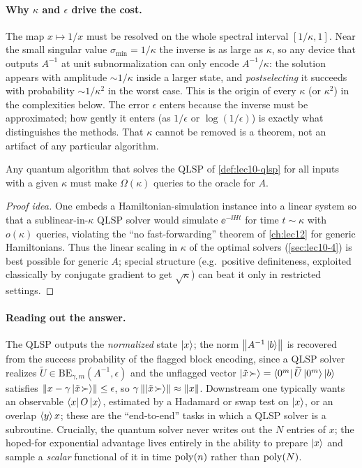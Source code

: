 \paragraph{Why $\kappa$ and $\epsilon$ drive the cost.}
The map $x\mapsto1/x$ must be resolved on the whole spectral interval $[1/\kappa,1]$.
Near the small singular value $\sigma_{\min}=1/\kappa$ the inverse is as large as
$\kappa$, so any device that outputs $A^{-1}$ at unit subnormalization can only encode
$A^{-1}/\kappa$: the solution appears with amplitude $\sim1/\kappa$ inside a
larger state, and \emph{postselecting} it succeeds with probability $\sim1/\kappa^2$
in the worst case. This is the origin of every $\kappa$ (or $\kappa^2$) in the
complexities below. The error $\epsilon$ enters because the inverse must be
approximated; how gently it enters (as $1/\epsilon$ or $\log(1/\epsilon)$) is exactly
what distinguishes the methods. That $\kappa$ cannot be removed is a theorem, not an
artifact of any particular algorithm.

\begin{proposition}
\label{prop:lec10-lb}
Any quantum algorithm that solves the QLSP of \cref{def:lec10-qlsp} for all inputs with
a given $\kappa$ must make $\Omega(\kappa)$ queries to the oracle for $A$.
\end{proposition}

\begin{proof}[Proof idea]
One embeds a Hamiltonian-simulation instance into a linear system so that a
sublinear-in-$\kappa$ QLSP solver would simulate $\ee^{-\ii Ht}$ for time $t\sim\kappa$
with $o(\kappa)$ queries, violating the ``no fast-forwarding'' theorem of
\cref{ch:lec12} for generic Hamiltonians. Thus the linear scaling in $\kappa$ of the
optimal solvers (\cref{sec:lec10-4}) is best possible for generic $A$; special
structure (e.g.\ positive definiteness, exploited classically by conjugate gradient to
get $\sqrt\kappa$) can beat it only in restricted settings.
\end{proof}

\paragraph{Reading out the answer.}
The QLSP outputs the \emph{normalized} state $\ket x$; the norm $\left\lVert A^{-1}\ket b \right\rVert$ is
recovered from the success probability of the flagged block encoding, since a QLSP
solver realizes $\widetilde U\in\mathrm{BE}_{\gamma,m}(A^{-1},\epsilon)$ and the
unflagged vector $\ket{\tilde x\!\succ}=\bra{0^m}\widetilde U\ket{0^m}\ket b$ satisfies
$\left\lVert x-\gamma\ket{\tilde x\!\succ} \right\rVert\le\epsilon$, so $\gamma\left\lVert \ket{\tilde
x\!\succ} \right\rVert\approx\left\lVert x \right\rVert$. Downstream one typically wants an observable
$\bra x O\ket x$, estimated by a Hadamard or swap test on $\ket x$, or an overlap
$\braket{y}{x}$; these are the ``end-to-end'' tasks in which a QLSP solver is a
subroutine. Crucially, the quantum solver never writes out the $N$ entries of $x$; the
hoped-for exponential advantage lives entirely in the ability to prepare $\ket x$ and
sample a \emph{scalar} functional of it in time $\operatorname{poly}(n)$ rather than $\operatorname{poly}(N)$.

